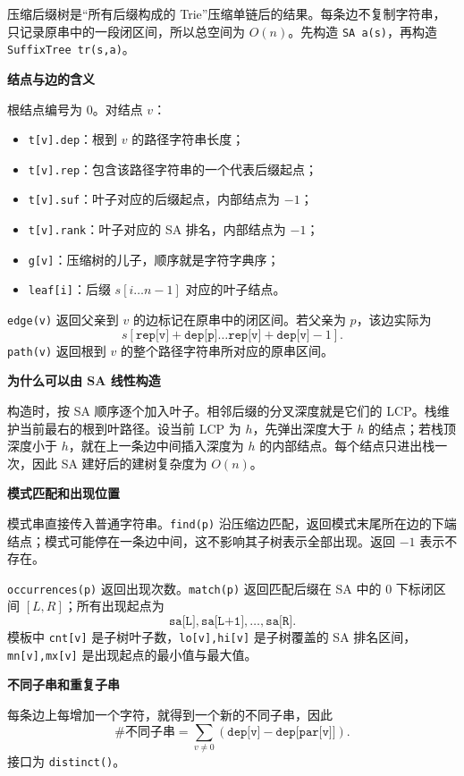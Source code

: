 压缩后缀树是“所有后缀构成的 Trie”压缩单链后的结果。每条边不复制字符串，只记录原串中的一段闭区间，所以总空间为 $O(n)$。先构造 \texttt{SA a(s)}，再构造 \texttt{SuffixTree tr(s,a)}。

\textbf{结点与边的含义}

根结点编号为 $0$。对结点 $v$：

\begin{itemize}
  \item \texttt{t[v].dep}：根到 $v$ 的路径字符串长度；
  \item \texttt{t[v].rep}：包含该路径字符串的一个代表后缀起点；
  \item \texttt{t[v].suf}：叶子对应的后缀起点，内部结点为 $-1$；
  \item \texttt{t[v].rank}：叶子对应的 SA 排名，内部结点为 $-1$；
  \item \texttt{g[v]}：压缩树的儿子，顺序就是字符字典序；
  \item \texttt{leaf[i]}：后缀 $s[i\ldots n-1]$ 对应的叶子结点。
\end{itemize}

\texttt{edge(v)} 返回父亲到 $v$ 的边标记在原串中的闭区间。若父亲为 $p$，该边实际为
\[
  s[\texttt{rep[v]}+\texttt{dep[p]}\ldots
    \texttt{rep[v]}+\texttt{dep[v]}-1].
\]
\texttt{path(v)} 返回根到 $v$ 的整个路径字符串所对应的原串区间。

\textbf{为什么可以由 SA 线性构造}

构造时，按 SA 顺序逐个加入叶子。相邻后缀的分叉深度就是它们的 LCP。栈维护当前最右的根到叶路径。设当前 LCP 为 $h$，先弹出深度大于 $h$ 的结点；若栈顶深度小于 $h$，就在上一条边中间插入深度为 $h$ 的内部结点。每个结点只进出栈一次，因此 SA 建好后的建树复杂度为 $O(n)$。

\textbf{模式匹配和出现位置}

模式串直接传入普通字符串。\texttt{find(p)} 沿压缩边匹配，返回模式末尾所在边的下端结点；模式可能停在一条边中间，这不影响其子树表示全部出现。返回 $-1$ 表示不存在。

\texttt{occurrences(p)} 返回出现次数。\texttt{match(p)} 返回匹配后缀在 SA 中的 $0$ 下标闭区间 $[L,R]$；所有出现起点为
\[
  \texttt{sa[L]},\texttt{sa[L+1]},\ldots,\texttt{sa[R]}.
\]
模板中 \texttt{cnt[v]} 是子树叶子数，\texttt{lo[v],hi[v]} 是子树覆盖的 SA 排名区间，\texttt{mn[v],mx[v]} 是出现起点的最小值与最大值。

\textbf{不同子串和重复子串}

每条边上每增加一个字符，就得到一个新的不同子串，因此
\[
  \#\text{不同子串}
  =\sum_{v\ne0}(\texttt{dep[v]}-\texttt{dep[par[v]]}).
\]
接口为 \texttt{distinct()}。

